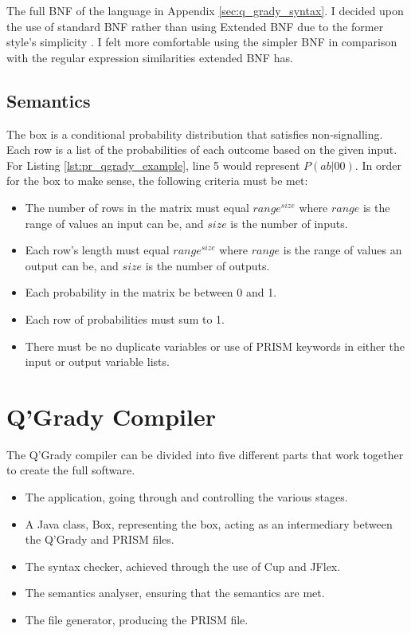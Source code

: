 \documentclass[report.tex]{subfiles}
\begin{document}
The full BNF of the language in Appendix \ref{sec:q_grady_syntax}. I decided
upon the use of standard BNF rather than using Extended BNF due to the former
style's simplicity \cite[chapter 2.3.4, p.~38]{Watt:1991:PLS:120468}. I felt
more comfortable using the simpler BNF in comparison with the regular expression
similarities extended BNF has.

\subsection{Semantics} %
\label{sub:semantics}
The box is a conditional probability distribution that satisfies non-signalling.
Each row is a list of the probabilities of each outcome based on the given
input. For Listing \ref{lst:pr_qgrady_example}, line 5 would represent 
\(P(ab | 00)\). In order for the box to make sense, the following criteria must
be met:
\begin{itemize}
    \item The number of rows in the matrix must equal \(range ^ {size}\) where
    \(range\) is the range of values an input can be, and \(size\) is the number
    of inputs.
    \item Each row's length must equal \(range ^{size}\) where \(range\) is
    the range of values an output can be, and \(size\) is the number of outputs.
    \item Each probability in the matrix be between 0 and 1.
    \item Each row of probabilities must sum to 1.
    \item There must be no duplicate variables or use of PRISM keywords in
    either the input or output variable lists.
\end{itemize}


\section{Q'Grady Compiler} %
\label{sec:q_grady_compiler}
The Q'Grady compiler can be divided into five different parts that work
together to create the full software.
\begin{itemize}
    \item The application, going through and controlling the various stages.
    \item A Java class, Box, representing the box, acting as an intermediary
    between the Q'Grady and PRISM files.
    \item The syntax checker, achieved through the use of Cup and JFlex.
    \item The semantics analyser, ensuring that the semantics are met.
    \item The file generator, producing the PRISM file.
\end{itemize}
\end{document}
